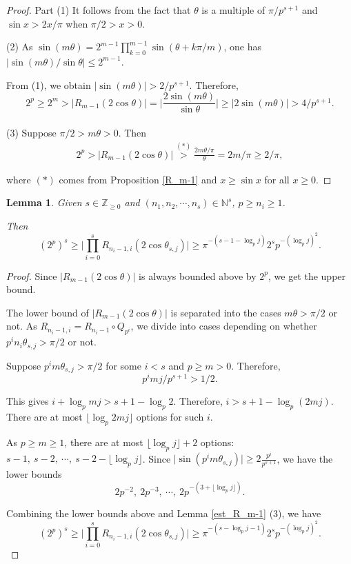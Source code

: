 \documentclass[11 pt]{amsart}
\theoremstyle{plain}
\newtheorem{lemma}[thm]{Lemma}
\theoremstyle{definition}
\theoremstyle{remark}
\def\Z{\mathbb{Z}}
\def\N{\mathbb{N}}
\begin{document}
\begin{proof}
Part (1) It follows from the fact that $\theta$ is a multiple of $\pi/ p^{s+1}$ and $\sin x > 2x/\pi $ when $\pi/2>x> 0$.

 (2) As $\sin (m\theta) =2^{m-1} \prod_{k=0}^{m-1} \sin( \theta + k\pi/m)$, one has $\vert \sin (m \theta)/\sin \theta \vert \le 2^{m-1}.$   

From (1), we obtain $\vert \sin (m \theta) \vert > 2/p^{s+1}.$ Therefore,  $$2^p \ge 2^m > \vert R_{m-1}(2 \cos \theta) \vert = \bigg\vert \frac{2\sin(m \theta)}{\sin \theta} \bigg\vert     \ge \vert 2 \sin (m \theta) \vert > 4/p^{s+1}.$$  
\\
(3) Suppose $\pi/2 > m\theta >0$. Then \begin{align*}
    2^p > \vert R_{m-1}(2 \cos \theta) \vert \stackrel{(*)}{>}  \frac{2m\theta/\pi}{\theta}=2m/\pi \ge 2/\pi,  
\end{align*}

where $(*)$ comes from Proposition \ref{R_m-1} and $x \ge \sin x$ for all $x \ge 0$.
\end{proof}


\begin{lemma}   
 \label{estPn}
    Given $s \in \Z_{\ge 0}$ and $(n_1, n_2, \cdots, n_s) \in \N^s$, $p \ge n_i \ge 1$.

    Then $$(2^p)^s \ge  \vert\prod_{i=0}^s R_{n_i-1, i}(2 \cos \theta_{s, j}) \vert \ge \pi^{-(s-1-\log_p j)}2^s p^{-(\log_p j)^2}.  $$
\end{lemma}

\begin{proof}
    Since $\vert R_{m-1}(2 \cos \theta) \vert$ is always bounded above by $2^p$, we get the upper bound.

    The lower bound of $\vert R_{m-1}(2 \cos \theta) \vert$ is separated into the cases $m \theta > \pi/2$ or not.  As $R_{n_i-1, i}=R_{n_i-1}\circ Q_{p^{i}}$, we divide into cases depending on whether $p^{i}n_i \theta_{s,j}> \pi/2$ or not.

    Suppose $p^im \theta_{s, j}>\pi/2$ for some $i<s$ and $p \ge m >0$. Therefore, $$p^imj/p^{s+1}>1/2.$$

    This gives $i+ \log _p mj>s+1-\log_p2.$ Therefore, $i>s+1 - \log_p (2mj).$ There are at most $\lfloor \log_p 2mj \rfloor$ options for such $i$. 

    As $p\ge m \ge 1$,  there are at most $\lfloor \log_p j \rfloor +2$ options: $s-1,\ s-2,\ \cdots,\ s-2-\lfloor \log_p j \rfloor$. Since $\vert \sin (p^{i} m \theta_{s, j}) \vert \ge 2 \frac{p^{i}}{p^{s+1}} $, we have the lower bounds 
    $$2p^{-2},\ 2p^{-3},\ \cdots,\ 2p^{-(3+ \lfloor \log_p j \rfloor )}.$$
    


    Combining the lower bounds above and Lemma \ref{est_R_m-1} (3), we have $$
    (2^p)^s \ge \vert \prod_{i=0}^s R_{n_i-1, i}(2\cos \theta_{s, j}) \vert \ge \pi^{-(s-\log_pj -1)}2^s p^{-(\log_p j)^2}.    
    $$
    
\end{proof}
\end{document}
